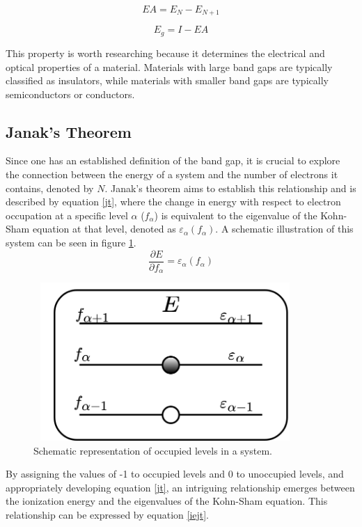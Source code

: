 \begin{equation}
\label{ae}
EA =  E_{N} - E_{N+1}
\end{equation}

\begin{equation}
\label{bg}
    E_{g} = I - EA
\end{equation}


This property is worth researching because it determines the electrical and optical properties of a material. Materials with large band gaps are typically classified as insulators, while materials with smaller band gaps are typically semiconductors or conductors.


\subsection{Janak's Theorem}
Since one has an established definition of the band gap, it is crucial to explore the connection between the energy of a system and the number of electrons it contains, denoted by $N$. Janak's theorem \cite{PhysRevB.18.7165}  aims to establish this relationship and is described by equation \ref{jt}, where the change in energy with respect to electron occupation at a specific level $\alpha$ ($f_{\alpha}$) is equivalent to the eigenvalue of the Kohn-Sham equation at that level, denoted as $\varepsilon_{\alpha}(f_{\alpha})$. A schematic illustration of this system can be seen in figure \ref{occ}.
\begin{equation}
\label{jt}
    \frac{ \partial E}{ \partial  f_{ \alpha } } = \varepsilon  _{ \alpha } ( f_{ \alpha } )  
\end{equation}

\begin{figure}[!ht]
        \centering
        \includegraphics[width=10cm,height=6cm]{images/occupation.png}
        \caption{Schematic representation of occupied levels in a system.}
        \label{occ}
\end{figure}
By assigning the values of -1 to occupied levels and 0 to unoccupied levels, and appropriately developing equation \ref{jt}, an intriguing relationship emerges between the ionization energy and the eigenvalues of the Kohn-Sham equation. This relationship can be expressed by equation \ref{iejt}.

